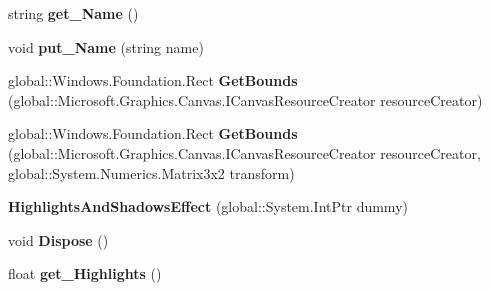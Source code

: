 \begin{DoxyCompactItemize}
string {\bfseries get\+\_\+\+Name} ()
\item 
\mbox{\label{class_microsoft_1_1_graphics_1_1_canvas_1_1_effects_1_1_highlights_and_shadows_effect_acf20a493f1e28673d987f629c6077443}} 
void {\bfseries put\+\_\+\+Name} (string name)
\item 
\mbox{\label{class_microsoft_1_1_graphics_1_1_canvas_1_1_effects_1_1_highlights_and_shadows_effect_a66405063039c09cfa97133d2a4735b0b}} 
global\+::\+Windows.\+Foundation.\+Rect {\bfseries Get\+Bounds} (global\+::\+Microsoft.\+Graphics.\+Canvas.\+I\+Canvas\+Resource\+Creator resource\+Creator)
\item 
\mbox{\label{class_microsoft_1_1_graphics_1_1_canvas_1_1_effects_1_1_highlights_and_shadows_effect_a52c38c5ad7bad6373c8a4bfa4c833cdf}} 
global\+::\+Windows.\+Foundation.\+Rect {\bfseries Get\+Bounds} (global\+::\+Microsoft.\+Graphics.\+Canvas.\+I\+Canvas\+Resource\+Creator resource\+Creator, global\+::\+System.\+Numerics.\+Matrix3x2 transform)
\item 
\mbox{\label{class_microsoft_1_1_graphics_1_1_canvas_1_1_effects_1_1_highlights_and_shadows_effect_a49c24ba8cbbe709553a047ed0a174cd5}} 
{\bfseries Highlights\+And\+Shadows\+Effect} (global\+::\+System.\+Int\+Ptr dummy)
\item 
\mbox{\label{class_microsoft_1_1_graphics_1_1_canvas_1_1_effects_1_1_highlights_and_shadows_effect_a46bf03f4381128bc91a8897ab8420b8e}} 
void {\bfseries Dispose} ()
\item 
\mbox{\label{class_microsoft_1_1_graphics_1_1_canvas_1_1_effects_1_1_highlights_and_shadows_effect_ad3f72cfd6e6d3034e5bfe3baa01927c1}} 
float {\bfseries get\+\_\+\+Highlights} ()
\item 
\mbox{\label{class_microsoft_1_1_graphics_1_1_canvas_1_1_effects_1_1_highlights_and_shadows_effect_a3be5bf341f60d60d01dde1546fb07565}} 

\end{DoxyCompactItemize}
